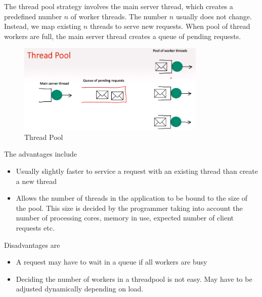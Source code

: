 \documentclass[a4paper]{article}
\theoremstyle{plain}
\theoremstyle{definition}
\newtheorem{defn}{Definition}[section]
\theoremstyle{remark}
\begin{document}
\begin{tcolorbox}[colback=black!3!white,colframe=black!60!white,title=\begin{defn}Thread Pool Strategy \label{Thread Pool Strategy}\end{defn}]
The thread pool strategy involves the main server thread, which creates a predefined number $n$ of worker threads. The number $n$ usually does not change. Instead, we map existing $n$ threads to serve new requests. When pool of thread workers are full, the main server thread creates a queue of pending requests. 
\begin{figure}[H]
	\centering
	\includegraphics[width=0.8\textwidth]{thirtythree.png}
	\caption{Thread Pool}
	\label{fig:thirtythree-png}
\end{figure}
The advantages include
\begin{itemize}
	\item Usually slightly faster to service a request with an existing thread than create a new thread
	\item Allows the number of threads in the application to be bound to the size of the pool. This size is decided by the programmer taking into account the number of processing cores, memory in use, expected number of client requests etc.
\end{itemize}
Disadvantages are
\begin{itemize}
	\item A request may have to wait in a queue if all workers are busy
	\item Deciding the number of workers in a threadpool is not easy. May have to be adjusted dynamically depending on load.
\end{itemize}
\end{tcolorbox}
\end{document}
